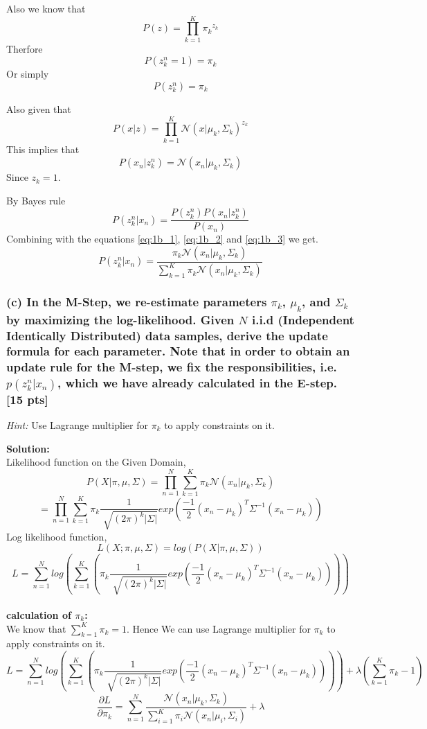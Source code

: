 \documentclass[twoside,10pt]{article}
\begin{document}
Also we know that 
$$ P(z) = \prod_{k=1}^K {\pi_k}^{z_k}$$
Therfore 
$$ P(z_k^n = 1) = {\pi_k}$$
Or simply 
\begin{equation} P(z_k^n) = {\pi_k} \label{eq:1b_2} \end{equation}

Also given that 
$$ P(x|z) = \prod_{k=1}^{K} \mathcal{N}(x|\mu_k,\Sigma_k)^{z_k} $$
This implies that
\begin{equation}
P(x_n|z_k^n) = \mathcal{N}(x_n|\mu_k,\Sigma_k)
\label{eq:1b_3}
\end{equation}
Since $ z_k = 1$.

By Bayes rule
$$P(z_k^n|x_n) = \frac{P(z_k^n)P(x_n|z_k^n)}{P(x_n)}$$
Combining with the equations \eqref{eq:1b_1}, \eqref{eq:1b_2} and \eqref{eq:1b_3} we get.
$$\boxed{P(z_k^n|x_n) = \frac{{\pi_k} \mathcal{N}(x_n|\mu_k,\Sigma_k)}
{\sum_{k = 1}^{K} { {\pi_k} \mathcal{N}(x_n|\mu_k,\Sigma_k)}}}$$


\newpage
\subsubsection*{(c) In the M-Step, we re-estimate parameters $\pi_k$, $\mu_k$,
and $\Sigma_k$ by maximizing the log-likelihood. Given $N$ i.i.d (Independent
Identically Distributed) data samples, derive the update formula for
each parameter. Note that in order to obtain an update rule for the M-step, we fix the responsibilities, i.e. $p(z_k^n|x_n)$, which we have already calculated in the E-step. [15 pts]}

\emph{Hint:} Use Lagrange multiplier for $\pi_k$ to apply
constraints on it.


\textbf{ Solution: }\\

Likelihood function on the Given Domain, $$P(X|\pi,\mu,\Sigma) = \prod_{n = 1}^{N} {\sum_{k=1}^{K} {\pi_k \mathcal{N}(x_n|\mu_k,\Sigma_k)}} $$
$$ = \prod_{n = 1}^{N} {\sum_{k=1}^{K} {\pi_k \frac{1}{\sqrt[]{(2\pi)^k|\Sigma|}} exp(\frac{-1}{2}(x_n - \mu_k)^T \Sigma ^ {-1} (x_n - \mu_k))}} $$
Log likelihood function,
$$L(X;\pi,\mu,\Sigma) = log(P(X|\pi,\mu,\Sigma))$$
$$ L = \sum_{n=1}^{N}log (\sum_{k=1}^{K}(\pi_k \frac{1}{\sqrt[]{(2\pi)^k|\Sigma|}} exp(\frac{-1}{2}(x_n - \mu_k)^T \Sigma ^ {-1} (x_n - \mu_k))))$$
\vspace{0.5cm}\\
\textbf{calculation of $\pi_k$:}\\
\hspace{0.5cm} 
We know that $\sum_{k=1}^K {\pi_k} = 1$. Hence We can use Lagrange multiplier for $\pi_k$ to apply
constraints on it.
$$ L = \sum_{n=1}^{N}log (\sum_{k=1}^{K}(\pi_k \frac{1}{\sqrt[]{(2\pi)^k|\Sigma|}} exp(\frac{-1}{2}(x_n - \mu_k)^T \Sigma ^ {-1} (x_n - \mu_k)))) + \lambda(\sum_{k=1}^K {\pi_k} - 1) $$
$$\frac{\partial L}{\partial \pi_k}  = \sum_{n = 1}^{N} {\frac{\mathcal{N}{(x_n|\mu_k,\Sigma_k)}}{\sum_{i = 1}^{K}{\pi_i\mathcal{N}{(x_n|\mu_i,\Sigma_i)}}}} + \lambda$$
\end{document}
